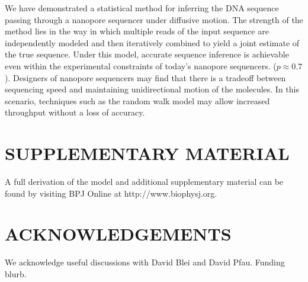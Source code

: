\documentclass{biophys_letter}
\begin{document}
We have demonstrated a statistical method for inferring the DNA sequence passing through a nanopore sequencer under diffusive motion.
The strength of the method lies in the way in which multiple reads of the input sequence are independently modeled and then iteratively combined to yield a joint estimate of the true sequence.
Under this model, accurate sequence inference is achievable even within the experimental constraints of today's nanopore sequencers. ($p \approx 0.7$).
Designers of nanopore sequencers may find that there is a tradeoff between sequencing speed and maintaining unidirectional motion of the molecules.
In this scenario, techniques such as the random walk model may allow increased throughput without a loss of accuracy.

\section*{SUPPLEMENTARY MATERIAL}

A full derivation of the model and additional supplementary material can be found by visiting BPJ Online at http://www.biophysj.org.\vspace*{6pt}

\section*{ACKNOWLEDGEMENTS}

We acknowledge useful discussions with David Blei and David Pfau. Funding blurb.
\end{document}
